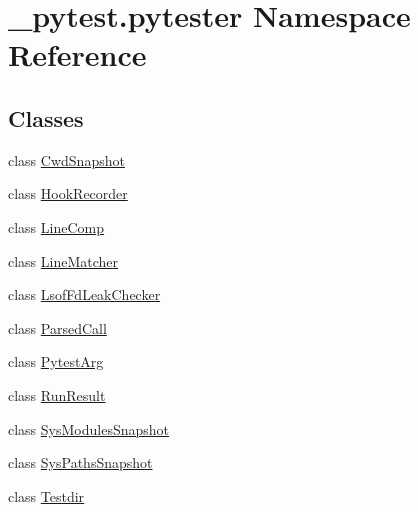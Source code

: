 \hypertarget{namespace__pytest_1_1pytester}{}\section{\+\_\+pytest.\+pytester Namespace Reference}
\label{namespace__pytest_1_1pytester}
\subsection*{Classes}
\begin{DoxyCompactItemize}
\item 
class \hyperlink{class__pytest_1_1pytester_1_1_cwd_snapshot}{Cwd\+Snapshot}
\item 
class \hyperlink{class__pytest_1_1pytester_1_1_hook_recorder}{Hook\+Recorder}
\item 
class \hyperlink{class__pytest_1_1pytester_1_1_line_comp}{Line\+Comp}
\item 
class \hyperlink{class__pytest_1_1pytester_1_1_line_matcher}{Line\+Matcher}
\item 
class \hyperlink{class__pytest_1_1pytester_1_1_lsof_fd_leak_checker}{Lsof\+Fd\+Leak\+Checker}
\item 
class \hyperlink{class__pytest_1_1pytester_1_1_parsed_call}{Parsed\+Call}
\item 
class \hyperlink{class__pytest_1_1pytester_1_1_pytest_arg}{Pytest\+Arg}
\item 
class \hyperlink{class__pytest_1_1pytester_1_1_run_result}{Run\+Result}
\item 
class \hyperlink{class__pytest_1_1pytester_1_1_sys_modules_snapshot}{Sys\+Modules\+Snapshot}
\item 
class \hyperlink{class__pytest_1_1pytester_1_1_sys_paths_snapshot}{Sys\+Paths\+Snapshot}
\item 
class \hyperlink{class__pytest_1_1pytester_1_1_testdir}{Testdir}
\end{DoxyCompactItemize}
